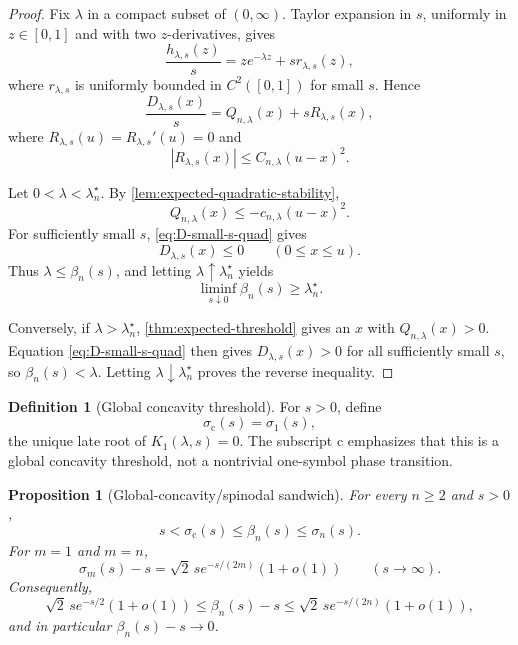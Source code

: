 \documentclass[11pt]{article}
\theoremstyle{plain}
\newtheorem{proposition}[theorem]{Proposition}
\theoremstyle{definition}
\newtheorem{definition}[theorem]{Definition}
\theoremstyle{remark}
\begin{document}
\begin{proof}
Fix \(\lambda\) in a compact subset of \((0,\infty)\).  Taylor expansion in \(s\), uniformly in \(z\in[0,1]\) and with two \(z\)-derivatives, gives
\begin{equation}\label{eq:h-small-s-C2}
\frac{h_{\lambda,s}(z)}s
=ze^{-\lambda z}+s r_{\lambda,s}(z),
\end{equation}
where \(r_{\lambda,s}\) is uniformly bounded in \(C^2([0,1])\) for small \(s\).  Hence
\begin{equation}\label{eq:D-small-s-quad}
\frac{D_{\lambda,s}(x)}s
=Q_{n,\lambda}(x)+sR_{\lambda,s}(x),
\end{equation}
where \(R_{\lambda,s}(u)=R_{\lambda,s}'(u)=0\) and
\[
|R_{\lambda,s}(x)|\le C_{n,\lambda}(u-x)^2.
\]

Let \(0<\lambda<\lambda_n^\star\).  By \cref{lem:expected-quadratic-stability},
\[
Q_{n,\lambda}(x)\le-c_{n,\lambda}(u-x)^2.
\]
For sufficiently small \(s\), \eqref{eq:D-small-s-quad} gives
\[
D_{\lambda,s}(x)\le0
\qquad(0\le x\le u).
\]
Thus \(\lambda\le\beta_n(s)\), and letting \(\lambda\uparrow\lambda_n^\star\) yields
\[
\liminf_{s\downarrow0}\beta_n(s)\ge\lambda_n^\star.
\]

Conversely, if \(\lambda>\lambda_n^\star\), \cref{thm:expected-threshold} gives an \(x\) with \(Q_{n,\lambda}(x)>0\).  Equation \eqref{eq:D-small-s-quad} then gives \(D_{\lambda,s}(x)>0\) for all sufficiently small \(s\), so \(\beta_n(s)<\lambda\).  Letting \(\lambda\downarrow\lambda_n^\star\) proves the reverse inequality.
\end{proof}

\begin{definition}[Global concavity threshold]
For \(s>0\), define
\[
\sigma_{\mathrm c}(s)=\sigma_1(s),
\]
the unique late root of \(K_1(\lambda,s)=0\).  The subscript \(\mathrm c\) emphasizes that this is a global concavity threshold, not a nontrivial one-symbol phase transition.
\end{definition}

\begin{proposition}[Global-concavity/spinodal sandwich]\label{prop:spinodal-bound}
For every \(n\ge2\) and \(s>0\),
\begin{equation}\label{eq:beta-sigma-bound}
s<\sigma_{\mathrm c}(s)\le\beta_n(s)\le\sigma_n(s).
\end{equation}
For \(m=1\) and \(m=n\),
\begin{equation}\label{eq:sigma-asymptotic}
\sigma_m(s)-s
=\sqrt2\,s e^{-s/(2m)}(1+o(1))
\qquad(s\to\infty).
\end{equation}
Consequently,
\begin{equation}\label{eq:beta-diagonal}
\sqrt2\,s e^{-s/2}(1+o(1))
\le\beta_n(s)-s
\le\sqrt2\,s e^{-s/(2n)}(1+o(1)),
\end{equation}
and in particular \(\beta_n(s)-s\to0\).
\end{proposition}
\end{document}
